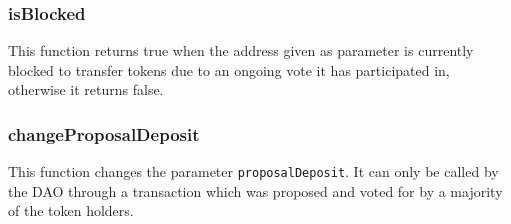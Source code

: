 \documentclass[9pt,oneside]{amsart}
\begin{document}
\begin{multicols}{2}
\subsubsection*{isBlocked}
This function returns true when the address given as parameter is currently blocked to transfer tokens due to an ongoing vote it has participated in, otherwise it returns false.

\subsubsection*{changeProposalDeposit}
This function changes the parameter \verb|proposalDeposit|. It can only be called by the DAO through a transaction which was proposed and voted for by a majority of the token holders.


\end{multicols}
\end{document}
